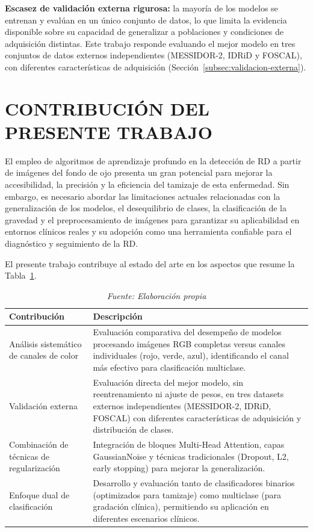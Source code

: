 \textbf{Escasez de validación externa rigurosa:} la mayoría de los modelos se entrenan y
evalúan en un único conjunto de datos, lo que limita la evidencia disponible sobre su
capacidad de generalizar a poblaciones y condiciones de adquisición distintas. Este
trabajo responde evaluando el mejor modelo en tres conjuntos de datos externos
independientes (MESSIDOR-2, IDRiD y FOSCAL), con diferentes características de
adquisición (Sección~\ref{subsec:validacion-externa}).

\section{CONTRIBUCIÓN DEL PRESENTE TRABAJO}

El empleo de algoritmos de aprendizaje profundo en la detección de RD a partir de
imágenes del fondo de ojo presenta un gran potencial para mejorar la accesibilidad, la
precisión y la eficiencia del tamizaje de esta enfermedad. Sin embargo, es necesario
abordar las limitaciones actuales relacionadas con la generalización de los modelos, el
desequilibrio de clases, la clasificación de la gravedad y el preprocesamiento de
imágenes para garantizar su aplicabilidad en entornos clínicos reales y su adopción como
una herramienta confiable para el diagnóstico y seguimiento de la RD.

El presente trabajo contribuye al estado del arte en los aspectos que resume la
Tabla~\ref{tab:contribuciones}.

\begin{table}[H]
\centering
\renewcommand{\arraystretch}{1.4}
\caption{Contribuciones del presente trabajo}
\label{tab:contribuciones}
\begin{tabularx}{\textwidth}{l X}
\hline
\textbf{Contribución} & \textbf{Descripción} \\ \hline
Análisis sistemático de canales de color & Evaluación comparativa del desempeño de
modelos procesando imágenes RGB completas versus canales individuales (rojo, verde,
azul), identificando el canal más efectivo para clasificación multiclase. \\
Validación externa & Evaluación directa del mejor modelo, sin reentrenamiento
ni ajuste de pesos, en tres datasets externos independientes (MESSIDOR-2, IDRiD,
FOSCAL) con diferentes características de adquisición y distribución de clases. \\
Combinación de técnicas de regularización & Integración de bloques Multi-Head
Attention, capas GaussianNoise y técnicas tradicionales (Dropout, L2, early stopping)
para mejorar la generalización. \\
Enfoque dual de clasificación & Desarrollo y evaluación tanto de clasificadores
binarios (optimizados para tamizaje) como multiclase (para gradación clínica),
permitiendo su aplicación en diferentes escenarios clínicos. \\ \hline
\end{tabularx}
\caption*{\textit{Fuente: Elaboración propia}}
\end{table}
